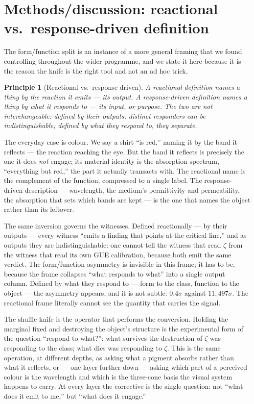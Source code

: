 \documentclass[11pt]{article}
\newtheorem{principle}{Principle}
\begin{document}
\section{Methods/discussion: reactional vs.\ response-driven definition}\label{sec:epistemology}

The form/function split is an instance of a more general framing that we found controlling throughout the wider programme, and we state it here because it is the reason the knife is the right tool and not an ad hoc trick.

\begin{principle}[Reactional vs.\ response-driven]
A \emph{reactional} definition names a thing by the reaction it emits --- its output. A \emph{response-driven} definition names a thing by what it responds to --- its input, or purpose. The two are not interchangeable: defined by their outputs, distinct responders can be indistinguishable; defined by what they respond to, they separate.
\end{principle}

The everyday case is colour. We say a shirt ``is red,'' naming it by the band it reflects --- the reaction reaching the eye. But the band it reflects is precisely the one it does \emph{not} engage; its material identity is the absorption spectrum, ``everything but red,'' the part it actually transacts with. The reactional name is the complement of the function, compressed to a single label. The response-driven description --- wavelength, the medium's permittivity and permeability, the absorption that sets which bands are kept --- is the one that names the object rather than its leftover.

The same inversion governs the witnesses. Defined reactionally --- by their outputs --- every witness ``emits a finding that points at the critical line,'' and as outputs they are indistinguishable: one cannot tell the witness that read $\zeta$ from the witness that read its own GUE calibration, because both emit the same verdict. The form/function asymmetry is invisible in this frame; it has to be, because the frame collapses ``what responds to what'' into a single output column. Defined by what they respond to --- form to the class, function to the object --- the asymmetry appears, and it is not subtle: $0.4\sigma$ against $11{,}497\sigma$. The reactional frame literally cannot see the quantity that carries the signal.

The shuffle knife is the operator that performs the conversion. Holding the marginal fixed and destroying the object's structure is the experimental form of the question ``respond to what?'': what survives the destruction of $\zeta$ was responding to the class; what dies was responding to $\zeta$. This is the same operation, at different depths, as asking what a pigment absorbs rather than what it reflects, or --- one layer further down --- asking which part of a perceived colour is the wavelength and which is the three-cone basis the visual system happens to carry. At every layer the corrective is the single question: not ``what does it emit to me,'' but ``what does it engage.''
\end{document}

